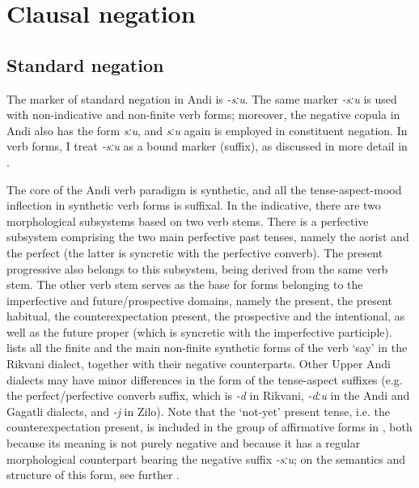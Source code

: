 \documentclass[output=paper,colorlinks=true, citecolor=brown]{langscibook}
\begin{document}
\section{Clausal negation} \label{sec:and:2}

\subsection{Standard negation} \label{sec:and:2.1}

The marker of standard negation in Andi is \textit{{}-sːu}. The same marker \textit{{}-sːu} is used with non-indicative and non-finite verb forms; moreover, the negative copula in Andi also has the form \textit{sːu}, and \textit{sːu} again is employed in constituent negation. In verb forms, I treat \textit{{}-sːu} as a bound marker (suffix), as discussed in more detail in .

The core of the Andi verb paradigm is synthetic, and all the tense-aspect-mood inflection in synthetic verb forms is suffixal. In the indicative, there are two morphological subsystems based on two verb stems. There is a perfective subsystem comprising the two main perfective past tenses, namely the aorist and the perfect (the latter is syncretic with the perfective converb). The present progressive also belongs to this subsystem, being derived from the same verb stem. The other verb stem serves as the base for forms belonging to the imperfective and future/prospective domains, namely the present, the present habitual, the counterexpectation present, the prospective and the intentional, as well as the future proper (which is syncretic with the imperfective participle).  lists all the finite and the main non-finite synthetic forms of the verb ‘say’ in the Rikvani dialect, together with their negative counterparts. Other Upper Andi dialects may have minor differences in the form of the tense-aspect suffixes (e.g. the per\-fect/perfective converb suffix, which is \textit{{}-d} in Rikvani, \textit{\nobreakdash-dːu} in the Andi and Gagatli dialects, and \textit{{}-j} in Zilo). Note that the ‘not{}-yet’ present tense, i.e. the counterexpectation present, is included in the group of affirmative forms in , both because its meaning is not purely negative and because it has a regular morphological counterpart bearing the negative suffix \textit{{}-sːu}; on the semantics and structure of this form, see further .
\end{document}
